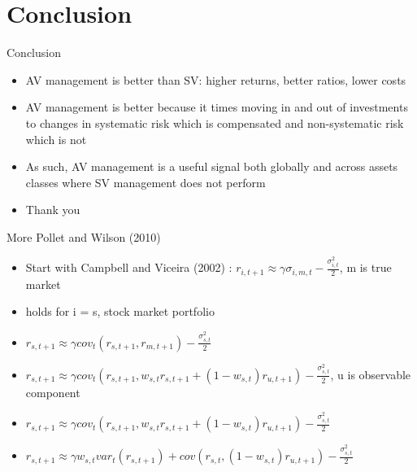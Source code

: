 \documentclass[handout]{beamer}
\begin{document}
\section{Conclusion}
\begin{frame}{Conclusion}
	\begin{itemize}
		\item AV management is better than SV: higher returns, better ratios, lower costs
		\item AV management is better because it times moving in and out of investments to changes in systematic risk which is compensated and non-systematic risk which is not
		\item As such, AV management is a useful signal both globally and across assets classes where SV management does not perform
		\item Thank you
	\end{itemize}
\end{frame}

\appendix

\begin{frame}{More Pollet and Wilson (2010)}
	\hypertarget{PWII}{}
	\begin{itemize}
		\item Start with Campbell and Viceira (2002) : $r_{i,t+1} \approx \gamma\sigma_{i,m,t} - \frac{\sigma_{i,t}^{2}}{2}$, m is true market
		\item holds for i = s, stock market portfolio
		\item $r_{s,t+1} \approx \gamma cov_{t}(r_{s,t+1},r_{m,t+1}) - \frac{\sigma_{s,t}^{2}}{2}$ 
		\item $r_{s,t+1} \approx \gamma cov_{t}(r_{s,t+1},w_{s,t}r_{s,t+1}+(1-w_{s,t})r_{u,t+1}) - \frac{\sigma_{s,t}^{2}}{2}$, u is observable component
		\item $r_{s,t+1} \approx \gamma cov_{t}(r_{s,t+1},w_{s,t}r_{s,t+1}+(1-w_{s,t})r_{u,t+1}) - \frac{\sigma_{s,t}^{2}}{2}$ 
		\item $r_{s,t+1} \approx \gamma w_{s,t} var_{t}(r_{s,t+1})+cov(r_{s,t},(1-w_{s,t})r_{u,t+1}) - \frac{\sigma_{s,t}^{2}}{2}$ 
	\end{itemize}
\end{frame}
\end{document}
